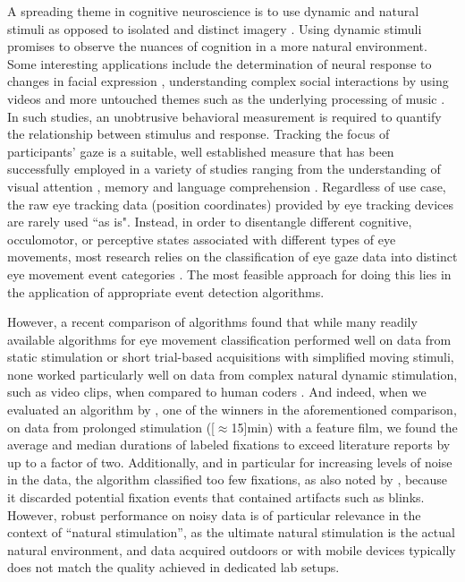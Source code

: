 A spreading theme in cognitive neuroscience is to use dynamic and natural
stimuli as opposed to isolated and distinct imagery \citep{real_world}. Using
dynamic stimuli promises to observe the nuances of cognition in a more natural
environment. Some interesting applications include the determination of neural
response to changes in facial expression \citep{Harris2014}, understanding
complex social interactions by using videos \citep{Tikka2012} and more
untouched themes such as the underlying processing of music
\citep{Toiviainen2014}. In such studies, an unobtrusive behavioral measurement
is required to quantify the relationship between stimulus and response.
Tracking the focus of participants' gaze is a suitable, well established
measure that has been successfully employed in a variety of studies ranging
from the understanding of visual attention \citep{HantaoLiu2011}, memory
\citep{Hannula2010} and language comprehension \citep{Gordon2006}.
%
Regardless of use case, the raw eye tracking data (position coordinates)
provided by eye tracking devices are rarely used ``as is". Instead, in order
to disentangle different cognitive, occulomotor, or perceptive states
associated with different types of eye movements, most research relies on the
classification of eye gaze data into distinct eye movement event categories
\citep{Schutz2011}. The most feasible approach for doing this lies in the
application of appropriate event detection algorithms.

However, a recent comparison of algorithms found that while many readily
available algorithms for eye movement classification performed well on data
from static stimulation or short trial-based acquisitions with simplified
moving stimuli, none worked particularly well on data from complex natural
dynamic stimulation, such as video clips, when compared to human coders
\citep{Andersson2017}.
%
And indeed, when we evaluated an algorithm by \citet{Nystrom2010AnData}, one of
the winners in the aforementioned comparison, on data from prolonged
stimulation (\unit[$\approx$15]{min}) with a feature film, we found the
average and median durations of labeled fixations to exceed literature
reports \citep[\eg][]{holmqvist2011eye,dorr2010variability} by up to a factor
of two.  Additionally, and in particular for increasing levels of noise in the
data, the algorithm classified too few fixations, as also noted by
\citet{Friedman2018}, because it discarded potential fixation events that
contained artifacts such as blinks.
%
However, robust performance on noisy data is of particular relevance in the
context of ``natural stimulation'', as the ultimate natural stimulation is the
actual natural environment, and data acquired outdoors or with mobile
devices typically does not match the quality achieved in dedicated lab
setups.

